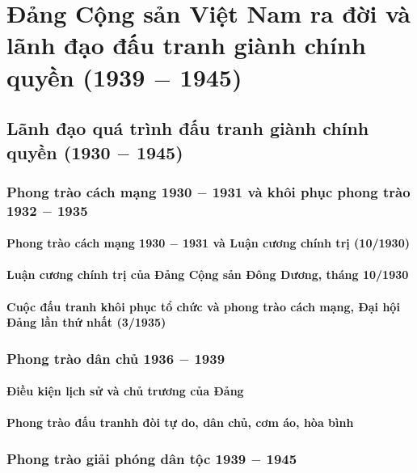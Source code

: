 \chapter{Đảng Cộng sản Việt Nam ra đời và lãnh đạo đấu tranh giành chính quyền (1939 $-$ 1945)}





\section{Lãnh đạo quá trình đấu tranh giành chính quyền (1930 $-$ 1945)}

\subsection{Phong trào cách mạng 1930 $-$ 1931 và khôi phục phong trào 1932 $-$ 1935}
\subsubsection{Phong trào cách mạng 1930 $-$ 1931 và Luận cương chính trị (10/1930)}
\subsubsection{Luận cương chính trị của Đảng Cộng sản Đông Dương, tháng 10/1930}
\subsubsection{Cuộc đấu tranh khôi phục tổ chức và phong trào cách mạng, Đại hội Đảng lần thứ nhất (3/1935)}

\subsection{Phong trào dân chủ 1936 $-$ 1939}
\subsubsection{Điều kiện lịch sử và chủ trương của Đảng}
\subsubsection{Phong trào đấu tranhh đòi tự do, dân chủ, cơm áo, hòa bình}

\subsection{Phong trào giải phóng dân tộc 1939 $-$ 1945}
